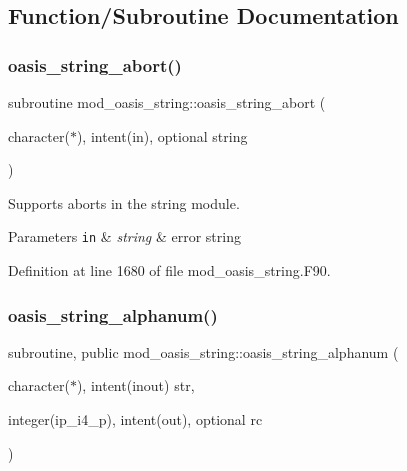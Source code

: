 \subsection{Function/\+Subroutine Documentation}
\mbox{\label{namespacemod__oasis__string_a86c2c26b793c41219bc833beb992d0e3}} 
\subsubsection{\texorpdfstring{oasis\+\_\+string\+\_\+abort()}{oasis\_string\_abort()}}
{\footnotesize\ttfamily subroutine mod\+\_\+oasis\+\_\+string\+::oasis\+\_\+string\+\_\+abort (\begin{DoxyParamCaption}\item[{character($\ast$), intent(in), optional}]{string }\end{DoxyParamCaption})\hspace{0.3cm}{\ttfamily [private]}}



Supports aborts in the string module. 


\begin{DoxyParams}[1]{Parameters}
\mbox{\tt in}  & {\em string} & error string \\
\hline
\end{DoxyParams}


Definition at line 1680 of file mod\+\_\+oasis\+\_\+string.\+F90.

\mbox{\label{namespacemod__oasis__string_af123aee419f09309d1ded79ae41243bd}} 
\subsubsection{\texorpdfstring{oasis\+\_\+string\+\_\+alphanum()}{oasis\_string\_alphanum()}}
{\footnotesize\ttfamily subroutine, public mod\+\_\+oasis\+\_\+string\+::oasis\+\_\+string\+\_\+alphanum (\begin{DoxyParamCaption}\item[{character($\ast$), intent(inout)}]{str,  }\item[{integer(ip\+\_\+i4\+\_\+p), intent(out), optional}]{rc }\end{DoxyParamCaption})}



